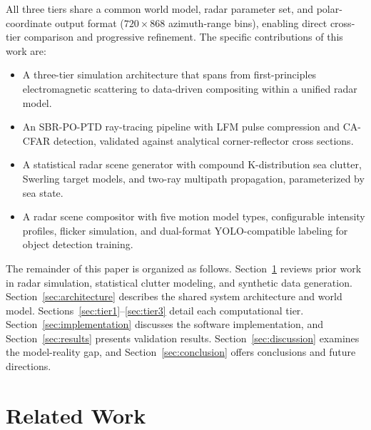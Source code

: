 \documentclass[conf]{new-aiaa}
\begin{document}
All three tiers share a common world model, radar parameter set, and polar-coordinate output format ($720 \times 868$ azimuth-range bins), enabling direct cross-tier comparison and progressive refinement. The specific contributions of this work are:
\begin{itemize}
    \item A three-tier simulation architecture that spans from first-principles electromagnetic scattering to data-driven compositing within a unified radar model.
    \item An SBR-PO-PTD ray-tracing pipeline with LFM pulse compression and CA-CFAR detection, validated against analytical corner-reflector cross sections.
    \item A statistical radar scene generator with compound K-distribution sea clutter, Swerling target models, and two-ray multipath propagation, parameterized by sea state.
    \item A radar scene compositor with five motion model types, configurable intensity profiles, flicker simulation, and dual-format YOLO-compatible labeling for object detection training.
\end{itemize}

The remainder of this paper is organized as follows. Section~\ref{sec:related} reviews prior work in radar simulation, statistical clutter modeling, and synthetic data generation. Section~\ref{sec:architecture} describes the shared system architecture and world model. Sections~\ref{sec:tier1}--\ref{sec:tier3} detail each computational tier. Section~\ref{sec:implementation} discusses the software implementation, and Section~\ref{sec:results} presents validation results. Section~\ref{sec:discussion} examines the model-reality gap, and Section~\ref{sec:conclusion} offers conclusions and future directions.

\section{Related Work}\label{sec:related}
\end{document}
